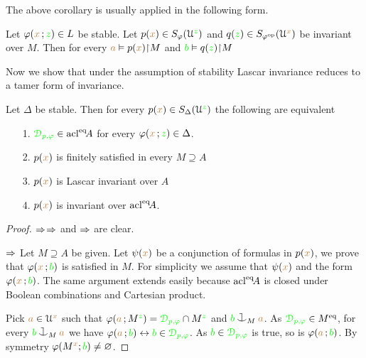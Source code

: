 The above corollary is usually applied in the following form. 

\begin{corollary}\label{corol_harrington1}
  Let $\varphi({\color{brown} x}\,;{\color{green} z})\in L$ be stable.
  Let $p({\color{brown} x})\in S_\varphi(\EuScript U^{\color{green} z})$ and $q({\color{green} z})\in S_{\varphi^{\rm op}}(\EuScript U^{\color{brown} x})$ be invariant over $M$.
  Then for every ${\color{brown} a}\vDash p({\color{brown} x}){\restriction}M$ and ${\color{green} b}\vDash q({\color{green} z}){\restriction}M$\smallskip
  
\end{corollary}

Now we show that under the assumption of stability Lascar invariance reduces to a tamer form of invariance.

\begin{proposition}\label{prop_type_over_acl2}
  Let $\Delta$ be stable.
  Then for every $p({\color{brown} x})\in S_\Delta(\EuScript U^{\color{green} z})$ the following are equivalent
  \begin{itemize}
  \item[1.] ${\color{green}\EuScript D_{p,\varphi}}\in {\rm acl}^{{\rm eq}}\!A$ for every $\varphi({\color{brown} x}\,;{\color{green} z})\in\Delta$.
  \item[2.] $p({\color{brown} x})$ is finitely satisfied in every $M\supseteq A$
  \item[3.] $p({\color{brown} x})$ is Lascar invariant over $A$
  \item[4.] $p({\color{brown} x})$ is invariant over ${\rm acl}^{{\rm eq}}\!A$.
  \end{itemize}
\end{proposition}
\begin{proof}
  $\Rightarrow$$\Rightarrow$ and $\Rightarrow$ are clear.

  $\Rightarrow$
  Let $M\supseteq A$ be given.
  Let $\psi({\color{brown} x})$ be a conjunction of formulas in $p({\color{brown} x})$, we prove that $\varphi({\color{brown} x}\,;{\color{green} b})$ is satisfied in $M$.
  For simplicity we assume that $\psi({\color{brown} x})$ and the form $\varphi({\color{brown} x}\,;{\color{green} b})$.
  The same argument extends easily because ${\rm acl}^{{\rm eq}}\!A$ is closed under Boolean combinations and Cartesian product.

  Pick ${\color{brown} a}\in\EuScript U^{\color{brown} x}$ such that $\varphi({\color{brown} a}\,;M^{\color{green} z})={\color{green}\EuScript D_{p,\varphi}}\cap M^{\color{green} z}$ and ${\gr b}\cnonfork_M{\mr a}$.
  As ${\color{green}\EuScript D_{p,\varphi}}\in M^{{\rm eq}}$, for every ${\gr b}\cnonfork_M{\mr a}$ we have $\varphi({\color{brown} a}\,;{\color{green} b})\leftrightarrow{\color{green}b}\in{\color{green}\EuScript D_{p,\varphi}}$.
  As ${\color{green} b}\in{\color{green}\EuScript D_{p,\varphi}}$ is true, so is $\varphi({\color{brown} a}\,;{\color{green} b})$.
  By symmetry $\varphi(M^{\color{brown} x};{\color{green} b})\neq\varnothing$.
\end{proof}

